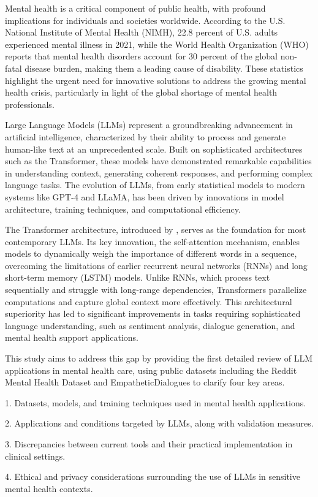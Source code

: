 Mental health is a critical component of public health, with profound implications for individuals and societies worldwide. According to the U.S. National Institute of Mental Health (NIMH), 22.8 percent of U.S. adults experienced mental illness in 2021, while the World Health Organization (WHO) reports that mental health disorders account for 30 percent of the global non-fatal disease burden, making them a leading cause of disability. These statistics highlight the urgent need for innovative solutions to address the growing mental health crisis, particularly in light of the global shortage of mental health professionals.

Large Language Models (LLMs) represent a groundbreaking advancement in artificial intelligence, characterized by their ability to process and generate human-like text at an unprecedented scale. Built on sophisticated architectures such as the Transformer, these models have demonstrated remarkable capabilities in understanding context, generating coherent responses, and performing complex language tasks. The evolution of LLMs, from early statistical models to modern systems like GPT-4 and LLaMA, has been driven by innovations in model architecture, training techniques, and computational efficiency.

The Transformer architecture, introduced by \cite{Vaswani2017}, serves as the foundation for most contemporary LLMs. Its key innovation, the self-attention mechanism, enables models to dynamically weigh the importance of different words in a sequence, overcoming the limitations of earlier recurrent neural networks (RNNs) and long short-term memory (LSTM) models. Unlike RNNs, which process text sequentially and struggle with long-range dependencies, Transformers parallelize computations and capture global context more effectively. This architectural superiority has led to significant improvements in tasks requiring sophisticated language understanding, such as sentiment analysis, dialogue generation, and mental health support applications.

This study aims to address this gap by providing the first detailed review of LLM applications in mental health care, using public datasets including the Reddit Mental Health Dataset \cite{low2020natural} and EmpatheticDialogues \cite{rashkin2019empathetic} to clarify four key areas.

1. Datasets, models, and training techniques used in mental health applications.

2. Applications and conditions targeted by LLMs, along with validation measures.

3. Discrepancies between current tools and their practical implementation in clinical settings.

4. Ethical and privacy considerations surrounding the use of LLMs in sensitive mental health contexts.